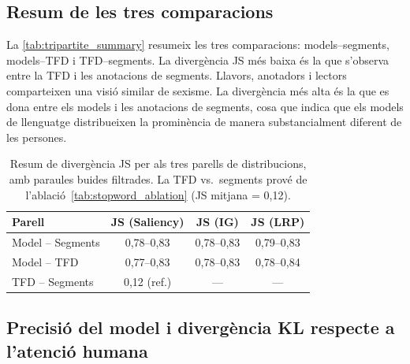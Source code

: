 \subsection{Resum de les tres comparacions}\label{sec:resum_tripartit}

La \autoref{tab:tripartite_summary} resumeix les tres comparacions: models--segments, models--TFD i TFD--segments.
La divergència JS més baixa és la que s'observa entre la TFD i les anotacions de segments.
Llavors, anotadors i lectors comparteixen una visió similar de sexisme.
La divergència més alta és la que es dona entre els models i les anotacions de segments, cosa que indica que els models de llenguatge distribueixen la prominència de manera substancialment diferent de les persones.
\iftables
\begin{table}[htbp]
\small
\centering
\begin{tabular}{lccc}
\toprule
\textbf{Parell} & \textbf{JS (Saliency)} & \textbf{JS (IG)} & \textbf{JS (LRP)} \\
\midrule
Model -- Segments  & 0,78--0,83 & 0,78--0,83 & 0,79--0,83 \\
Model -- TFD        & 0,77--0,83 & 0,78--0,83 & 0,78--0,84 \\
TFD -- Segments     & 0,12 (ref.) & --- & --- \\
\bottomrule
\end{tabular}
\caption{Resum de divergència JS per als tres parells de distribucions, amb paraules buides filtrades. La TFD vs.\ segments prové de l'ablació~\ref{tab:stopword_ablation} (JS mitjana = 0,12).}
\label{tab:tripartite_summary}
\end{table}
\fi

\subsection{Precisió del model i divergència KL respecte a l'atenció humana}\label{sec:kl_ikhwantri}

